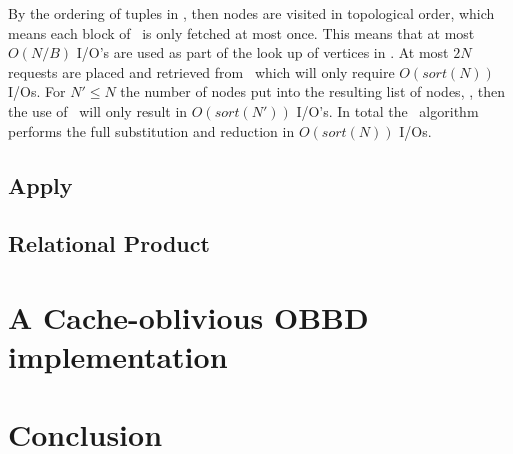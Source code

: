 By the ordering of tuples in \Q, then nodes are visited in topological order,
which means each block of \GV\ is only fetched at most once. This means that at
most $O(N/B)$ I/O's are used as part of the look up of vertices in \GV. At most
$2N$ requests are placed and retrieved from \Q\ which will only require
$O(sort(N))$ I/Os. For $N' \leq N$ the number of nodes put into the resulting
list of nodes, \ReduceL, then the use of \Reduce\ will only result in
$O(sort(N'))$ I/O's. In total the \Substitute\ algorithm performs the full
substitution and reduction in $O(sort(N))$ I/Os.

\subsection{Apply}


\subsection{Relational Product}


\section{A Cache-oblivious OBBD implementation} \label{sec:implementation}


\section{Conclusion} \label{sec:conclusion}


\printbibliography




